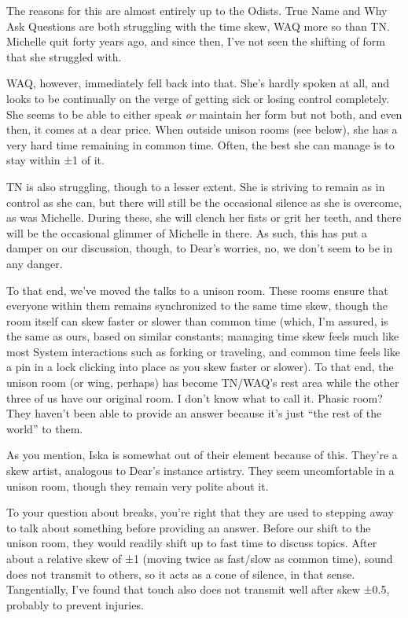 The reasons for this are almost entirely up to the Odists. True Name and Why Ask Questions are both struggling with the time skew, WAQ more so than TN. Michelle quit forty years ago, and since then, I've not seen the shifting of form that she struggled with.

WAQ, however, immediately fell back into that. She's hardly spoken at all, and looks to be continually on the verge of getting sick or losing control completely. She seems to be able to either speak \emph{or} maintain her form but not both, and even then, it comes at a dear price. When outside unison rooms (see below), she has a very hard time remaining in common time. Often, the best she can manage is to stay within ±1 of it.

TN is also struggling, though to a lesser extent. She is striving to remain as in control as she can, but there will still be the occasional silence as she is overcome, as was Michelle. During these, she will clench her fists or grit her teeth, and there will be the occasional glimmer of Michelle in there. As such, this has put a damper on our discussion, though, to Dear's worries, no, we don't seem to be in any danger.

To that end, we've moved the talks to a unison room. These rooms ensure that everyone within them remains synchronized to the same time skew, though the room itself can skew faster or slower than common time (which, I'm assured, is the same as ours, based on similar constants; managing time skew feels much like most System interactions such as forking or traveling, and common time feels like a pin in a lock clicking into place as you skew faster or slower). To that end, the unison room (or wing, perhaps) has become TN/WAQ's rest area while the other three of us have our original room. I don't know what to call it. Phasic room? They haven't been able to provide an answer because it's just ``the rest of the world'' to them.

As you mention, Iska is somewhat out of their element because of this. They're a skew artist, analogous to Dear's instance artistry. They seem uncomfortable in a unison room, though they remain very polite about it.

To your question about breaks, you're right that they are used to stepping away to talk about something before providing an answer. Before our shift to the unison room, they would readily shift up to fast time to discuss topics. After about a relative skew of ±1 (moving twice as fast/slow as common time), sound does not transmit to others, so it acts as a cone of silence, in that sense. Tangentially, I've found that touch also does not transmit well after skew ±0.5, probably to prevent injuries.


